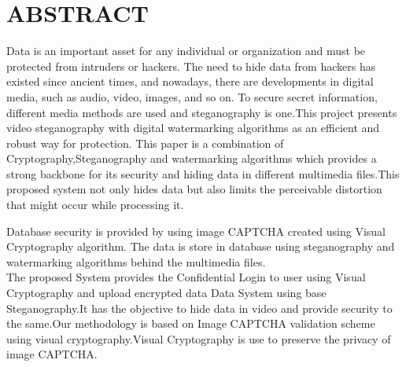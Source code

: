 \chapter*{\Huge\textbf{ABSTRACT}}

\hspace*{5em}Data is an important asset for any individual or organization and must be protected from intruders or hackers. The need to hide data from hackers has existed since ancient times, and nowadays, there are developments in digital media, such as audio, video, images, and so on. To secure secret information, different media methods are used and steganography is one.This project presents video steganography with digital watermarking algorithms as an efficient and robust way for protection. This paper is a combination of Cryptography,Steganography and watermarking algorithms which provides a strong backbone for its security and hiding data in different multimedia files.This proposed system not only hides data but also limits the perceivable distortion that might occur while processing it.\par
Database security is provided by using image CAPTCHA created using Visual Cryptography algorithm. The data is store in database using steganography and watermarking algorithms behind the multimedia files. 
  \\
The proposed System provides the Confidential Login to user using Visual Cryptography and upload encrypted data Data System using base Steganography.It has the objective to hide data in video and provide security to the same.Our methodology  is  based on Image CAPTCHA validation scheme using visual cryptography.Visual Cryptography is use to preserve the privacy of image CAPTCHA.
